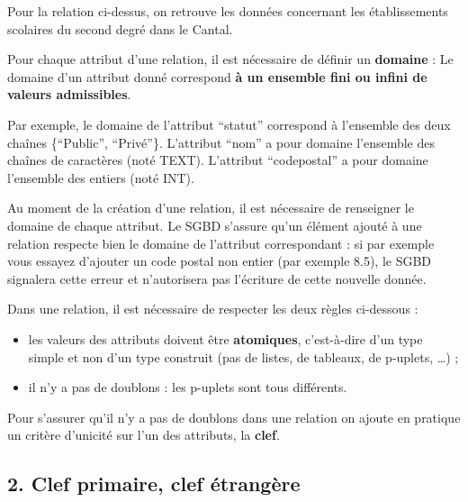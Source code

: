\documentclass[
  a4paper,
  DIV=11,
  numbers=noendperiod]{scrartcl}
\providecommand{\tightlist}{%
  \setlength{\itemsep}{0pt}\setlength{\parskip}{0pt}}\usepackage{longtable,booktabs,array}
\begin{document}
Pour la relation ci-dessus, on retrouve les données concernant les
établissements scolaires du second degré dans le Cantal.

Pour chaque attribut d'une relation, il est nécessaire de définir un
\textbf{domaine} : Le domaine d'un attribut donné correspond \textbf{à
un ensemble fini ou infini de valeurs admissibles}.

Par exemple, le domaine de l'attribut ``statut'' correspond à l'ensemble
des deux chaînes \{``Public'', ``Privé''\}. L'attribut ``nom'' a pour
domaine l'ensemble des chaînes de caractères (noté TEXT). L'attribut
``codepostal'' a pour domaine l'ensemble des entiers (noté INT).

Au moment de la création d'une relation, il est nécessaire de renseigner
le domaine de chaque attribut. Le SGBD s'assure qu'un élément ajouté à
une relation respecte bien le domaine de l'attribut correspondant : si
par exemple vous essayez d'ajouter un code postal non entier (par
exemple 8.5), le SGBD signalera cette erreur et n'autorisera pas
l'écriture de cette nouvelle donnée.

\begin{tcolorbox}[enhanced jigsaw, bottomtitle=1mm, toptitle=1mm, colbacktitle=quarto-callout-important-color!10!white, breakable, toprule=.15mm, bottomrule=.15mm, leftrule=.75mm, opacityback=0, rightrule=.15mm, coltitle=black, opacitybacktitle=0.6, title=\textcolor{quarto-callout-important-color}{\faExclamation}\hspace{0.5em}{Règles à respecter}, arc=.35mm, titlerule=0mm, left=2mm, colback=white]

Dans une relation, il est nécessaire de respecter les deux règles
ci-dessous :

\begin{itemize}
\tightlist
\item
  les valeurs des attributs doivent être \textbf{atomiques},
  c'est-à-dire d'un type simple et non d'un type construit (pas de
  listes, de tableaux, de p-uplets, \ldots) ;
\item
  il n'y a pas de doublons : les p-uplets sont tous différents.
\end{itemize}

\end{tcolorbox}

Pour s'assurer qu'il n'y a pas de doublons dans une relation on ajoute
en pratique un critère d'unicité sur l'un des attributs, la
\textbf{clef}.

\hypertarget{clef-primaire-clef-uxe9tranguxe8re}{%
\subsection{2. Clef primaire, clef
étrangère}\label{clef-primaire-clef-uxe9tranguxe8re}}
\end{document}
